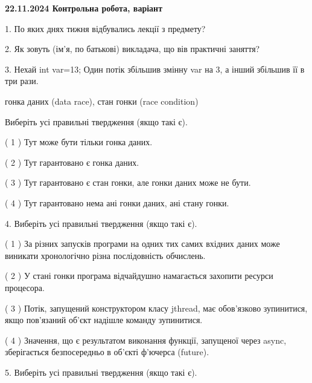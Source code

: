 \documentclass[12pt, ukrainian]{article}
\begin{document}
\vspace{4mm}
\newpage
\begin {large}

\textbf{22.11.2024 Контрольна робота, варіант  }\par


{
1. По яких днях тижня відбувались лекції з предмету?



\vspace{5mm}
2. Як зовуть (ім'я, по батькові) викладача, що вів практичні заняття?



\vspace{5mm}
3. Нехай int var=13; Один потік збільшив змінну var на 3, а інший збільшив її в три рази.

гонка даних (data race), стан гонки (race condition)

Виберіть усі правильні твердження (якщо такі є).\par
\vspace{2mm}
( 1 ) Тут може бути тільки гонка даних.%

( 2 ) Тут гарантовано є гонка даних.%

( 3 ) Тут гарантовано є стан гонки, але гонки даних може не бути.%

( 4 ) Тут гарантовано нема ані гонки даних, ані стану гонки.%


\vspace{5mm}
4. Виберіть усі правильні твердження (якщо такі є).\par
\vspace{2mm}

( 1 ) За різних запусків програми на одних тих самих вхідних даних може виникати хронологічно різна послідовність обчислень.%

( 2 ) У стані гонки програма відчайдушно намагається захопити ресурси процесора.%

( 3 ) Потік, запущений конструктором класу jthread, має обов’язково зупинитися, якщо пов’язаний об’єкт надішле команду зупинитися.%

( 4 ) Значення, що є результатом виконання функції, запущеної через async, зберігається безпосередньо в об’єкті ф’ючерса (future).%


\vspace{5mm}
5. Виберіть усі правильні твердження (якщо такі є).\par
\vspace{2mm}

}
\end{large}
\end{document}
